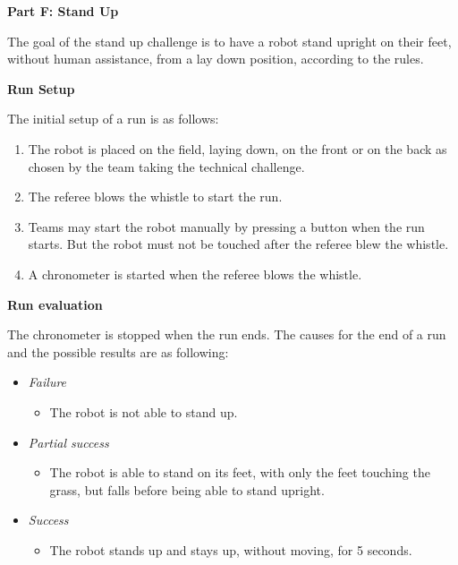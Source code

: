 \clearpage
\sffamily
{\bfseries \color[rgb]{0.4,0.4,0.4} Part F: Stand Up}
{}


\bigskip

The goal of the stand up challenge is to have a robot stand upright on their feet, without human assistance, from a lay down position, according to the rules.

\bigskip

{\bfseries Run Setup}

\smallskip

The initial setup of a run is as follows:

\begin{enumerate}

\item The robot is placed on the field, laying down, on the front or on the back as chosen by the team taking the technical challenge.

\item The referee blows the whistle to start the run.

\item Teams may start the robot manually by pressing a button when the run starts. But the robot must not be touched after the referee blew the whistle. 

\item A chronometer is started when the referee blows the whistle.
\end{enumerate}

{\bfseries Run evaluation}

\smallskip

The chronometer is stopped when the run ends. The causes for the end of a run and
the possible results are as following:
\begin{itemize}
\item \textit{Failure}
  \begin{itemize}
    \item The robot is not able to stand up.
     \end{itemize}
\item \textit{Partial success}
  \begin{itemize}
    \item The robot is able to stand on its feet, with only the feet touching the grass, but falls before being able to stand upright.
  \end{itemize}
\item \textit{Success}
  \begin{itemize}
    \item The robot stands up and stays up, without moving, for 5 seconds.
  \end{itemize}
\end{itemize}

